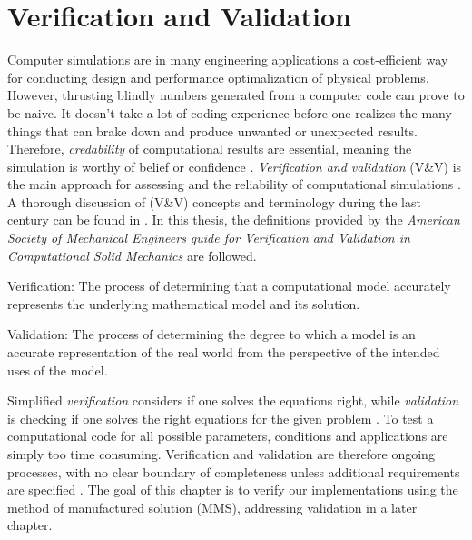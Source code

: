 \chapter{Verification and Validation}
 Computer simulations are in many engineering applications a cost-efficient way for conducting design and performance optimalization of physical problems. However, thrusting blindly numbers generated from a computer code can prove to be naive. It doesn't take a lot of coding experience before one realizes the many things that can brake down and produce unwanted or unexpected results. 
Therefore, \textit{credability} of computational results are essential, meaning the simulation is worthy of belief or confidence \cite{Oberkampf2010}. \textit{Verification and validation} (V\&V) is the main approach for assessing and the reliability of computational simulations \cite{Sommerville2006}.  A thorough discussion  of (V\&V) concepts and terminology during the last century can be found in \cite{Oberkampf2010}. In this thesis, the definitions provided by the \textit{American Society of Mechanical Engineers guide for Verification and Validation in Computational Solid Mechanics}  \cite{Schwer2006} are followed.

\begin{defn}
Verification: The process of determining that a computational model accurately represents
the underlying mathematical model and its solution. 
\end{defn}

\begin{defn}
Validation: The process of determining the degree to which a model is an accurate
representation of the real world from the perspective of the intended uses of the model. 
\end{defn}

Simplified \textit{verification} considers if one solves the equations right, while \textit{validation} is checking if one solves the right equations for the given problem \cite{Roache}. To test a computational code for all possible parameters, conditions and applications are simply too time consuming.   Verification and validation are therefore ongoing processes, with no clear boundary of completeness unless additional requirements are specified \cite{Roache}. The goal of this chapter is to verify our implementations using the method of manufactured solution  (MMS), addressing validation in a later chapter.

